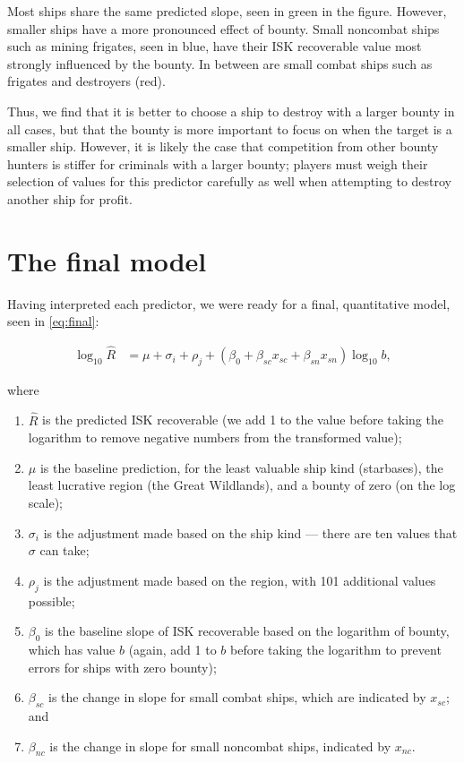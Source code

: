 \documentclass[letterpaper,12pt,article]{memoir}
\begin{document}
Most ships share the same predicted slope, seen in green in the figure. However,
smaller ships have a more pronounced effect of bounty. Small noncombat ships such
as mining frigates, seen in blue, have their ISK recoverable value most strongly
influenced by the bounty. In between are small combat ships such as frigates and 
destroyers (red). 

Thus, we find that it is better to choose a ship to destroy with a larger bounty
in all cases, but that the bounty is more important to focus on when the target
is a smaller ship. However, it is likely the case that competition from other 
bounty hunters is stiffer for criminals with a larger bounty; players must weigh
their selection of values for this predictor carefully as well when attempting to
destroy another ship for profit.

\section{The final model}

Having interpreted each predictor, we were ready for a final, quantitative model,
seen in \cref{eq:final}:

\begin{align} \label{eq:final}
    \log_{10}{\widehat{R}} &= \mu + \sigma_i + \rho_j + (\beta_0 + 
    \beta_{sc} x_{sc} + \beta_{sn} x_{sn}) \log_{10}{b}, 
\end{align}

where
\begin{enumerate}[nolistsep,label=\textbf{--}]
    \item $\widehat{R}$ is the predicted ISK recoverable (we add 1 to the value 
    before taking the logarithm to remove negative numbers from the transformed
    value);
    \item $\mu$ is the baseline prediction, for the least valuable ship kind
    (starbases), the least lucrative region (the Great Wildlands), and a bounty
    of zero (on the log scale);
    \item $\sigma_i$ is the adjustment made based on the ship kind --- there are
    ten values that $\sigma$ can take;
    \item $\rho_j$ is the adjustment made based on the region, with 101 additional
    values possible;
    \item $\beta_0$ is the baseline slope of ISK recoverable based on the logarithm
    of bounty, which has value $b$ (again, add 1 to $b$ before taking the logarithm
    to prevent errors for ships with zero bounty);
    \item $\beta_{sc}$ is the change in slope for small combat ships, which are
    indicated by $x_{sc}$; and
    \item $\beta_{nc}$ is the change in slope for small noncombat ships, indicated 
    by $x_{nc}$.
\end{enumerate}
\end{document}
